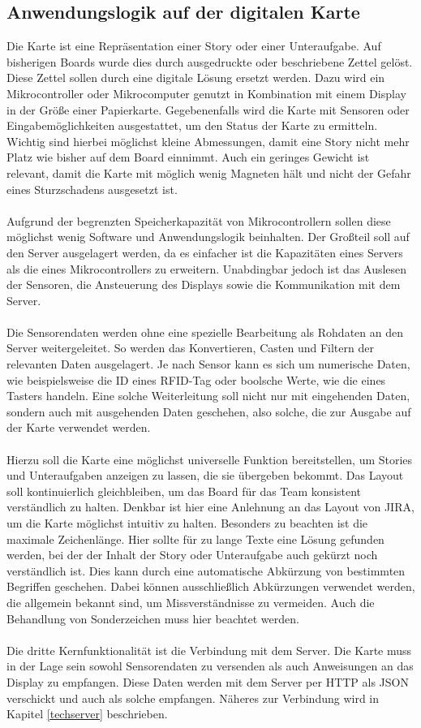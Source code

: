 \documentclass[12pt,titlepage]{scrartcl}
\begin{document}
		\subsection{Anwendungslogik auf der digitalen Karte} \label{defKarte}
		Die Karte ist eine Repräsentation einer Story oder einer Unteraufgabe. Auf bisherigen Boards wurde dies durch ausgedruckte oder beschriebene Zettel gelöst. Diese Zettel sollen durch eine digitale Lösung ersetzt werden. Dazu wird ein Mikrocontroller oder Mikrocomputer genutzt in Kombination mit einem Display in der Größe einer Papierkarte. Gegebenenfalls wird die Karte mit Sensoren oder Eingabemöglichkeiten ausgestattet, um den Status der Karte zu ermitteln. Wichtig sind hierbei möglichst kleine Abmessungen, damit eine Story nicht mehr Platz wie bisher auf dem Board einnimmt. Auch ein geringes Gewicht ist relevant, damit die Karte mit möglich wenig Magneten hält und nicht der Gefahr eines Sturzschadens ausgesetzt ist. \\ \\
		Aufgrund der begrenzten Speicherkapazität von Mikrocontrollern sollen diese möglichst wenig Software und Anwendungslogik beinhalten. Der Großteil soll auf den Server ausgelagert werden, da es einfacher ist die Kapazitäten eines Servers als die eines Mikrocontrollers zu erweitern. Unabdingbar jedoch ist das Auslesen der Sensoren, die Ansteuerung des Displays sowie die Kommunikation mit dem Server. \\ \\
Die Sensorendaten werden ohne eine spezielle Bearbeitung als Rohdaten an den Server weitergeleitet. So werden das Konvertieren, Casten und Filtern der relevanten Daten ausgelagert. Je nach Sensor kann es sich um numerische Daten, wie beispielsweise die ID eines RFID-Tag oder boolsche Werte, wie die eines Tasters handeln. Eine solche Weiterleitung soll nicht nur mit eingehenden Daten, sondern auch mit ausgehenden Daten geschehen, also solche, die zur Ausgabe auf der Karte verwendet werden. \\ \\
Hierzu soll die Karte eine möglichst universelle Funktion bereitstellen, um Stories und Unteraufgaben anzeigen zu lassen, die sie übergeben bekommt. Das Layout soll kontinuierlich gleichbleiben, um das Board für das Team konsistent verständlich zu halten. Denkbar ist hier eine Anlehnung an das Layout von JIRA, um die Karte möglichst intuitiv zu halten. Besonders zu beachten ist die maximale Zeichenlänge. Hier sollte für zu lange Texte eine Lösung gefunden werden, bei der der Inhalt der Story oder Unteraufgabe auch gekürzt noch verständlich ist. Dies kann durch eine automatische Abkürzung von bestimmten Begriffen geschehen. Dabei können ausschließlich Abkürzungen verwendet werden, die allgemein bekannt sind, um Missverständnisse zu vermeiden. Auch die Behandlung von Sonderzeichen muss hier beachtet werden. \\ \\
Die dritte Kernfunktionalität ist die Verbindung mit dem Server. Die Karte muss in der Lage sein sowohl Sensorendaten zu versenden als auch Anweisungen an das Display zu empfangen. Diese Daten werden mit dem Server per HTTP als JSON verschickt und auch als solche empfangen. Näheres zur Verbindung wird in Kapitel \ref{techserver} beschrieben.  
\end{document}
